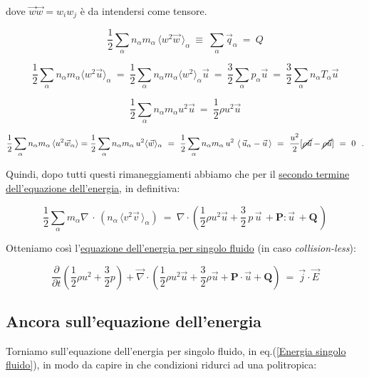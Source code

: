 dove $\vec w \vec w=w_iw_j$ è da intendersi come tensore.

\[ \frac{1}{2} \sum_\alpha n_\alpha m_\alpha\, \langle w^2 \vec w\, \rangle_\alpha \ \equiv\ \sum_\alpha \vec q_\alpha\ =\ Q\]

\[ \frac{1}{2} \sum_\alpha n_\alpha m_\alpha \langle w^2 \vec u \rangle_\alpha\ =\ \frac{1}{2} \sum_\alpha n_\alpha m_\alpha \langle w^2 \rangle _\alpha \vec u\ =\ \frac{3}{2} \sum_\alpha p_\alpha \vec u\ =\ \frac{3}{2} \sum_\alpha n_\alpha T_\alpha \vec u\]

\[ \frac{1}{2} \sum_\alpha n_\alpha m_\alpha u^2 \vec u\ =\ \frac{1}{2} \rho u^2 \vec u\]

\[ \frac{1}{2} \sum_\alpha n_\alpha m_\alpha\,\langle u^2 \vec w_\alpha \rangle = \frac{1}{2} \sum_\alpha n_\alpha m_\alpha\,u^2 \langle \vec w \rangle_\alpha\ =\ \frac{1}{2} \sum_\alpha n_\alpha m_\alpha\, u^2\ \langle\, \vec u_\alpha - \vec u\, \rangle\ =\ \frac{u^2}{2}[\cancel{\rho\vec u} - \cancel{\rho\vec u}]\ =\ 0\ \ . \]

Quindi, dopo tutti questi rimaneggiamenti abbiamo che per il \underline{secondo termine dell'equazione dell'energia}, in definitiva:

\[ \frac{1}{2} \sum_\alpha m_\alpha \nabla\, \cdot\, ( n_\alpha\, \langle v^2 \vec v \, \rangle_\alpha )\ =\ \nabla \cdot (\frac{1}{2}\rho u^2 \vec u + \frac{3}{2}\, p\, \vec u\, + \mathbf{P} : \vec u\, + \mathbf{Q}\, ) \]


Otteniamo così l'\underline{equazione dell'energia per singolo fluido} (in caso \emph{collision-less}):

\begin{equation}
	\label{Energia singolo fluido}
	\boxed{\frac{\partial}{\partial t} \left(\frac{1}{2}\rho u^2 +\frac{3}{2} p\right) + \vec\nabla \cdot \left( \frac{1}{2}\rho u^2 \vec u + \frac{3}{2}\rho\vec u  + \mathbf{P}\cdot\vec u + \mathbf{Q}\right) \ =\ \vec j\cdot \vec E}
\end{equation}



\vspace{0.5cm}



%
%
\subsection{Ancora sull'equazione dell'energia}

Torniamo sull'equazione dell'energia per singolo fluido, in eq.(\ref{Energia singolo fluido}), in modo da capire in che condizioni ridurci ad una politropica:

